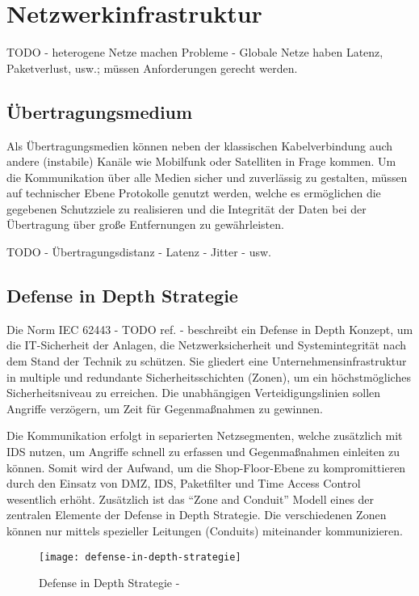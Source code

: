 \section{Netzwerkinfrastruktur}
TODO - heterogene Netze machen Probleme - Globale Netze haben Latenz, Paketverlust, usw.; müssen Anforderungen gerecht werden.

\subsection{Übertragungsmedium}
Als Übertragungsmedien können neben der klassischen Kabelverbindung auch andere (instabile) Kanäle wie Mobilfunk oder Satelliten in Frage kommen. Um die Kommunikation über alle Medien sicher und zuverlässig zu gestalten, müssen auf technischer Ebene Protokolle genutzt werden, welche es ermöglichen die gegebenen Schutzziele zu realisieren und die Integrität der Daten bei der Übertragung über große Entfernungen zu gewährleisten.

TODO - Übertragungsdistanz - Latenz - Jitter - usw.

\subsection{Defense in Depth Strategie}
Die Norm IEC 62443 - TODO ref. - beschreibt ein Defense in Depth Konzept, um die IT-Sicherheit der Anlagen, die Netzwerksicherheit und Systemintegrität nach dem Stand der Technik zu schützen. Sie gliedert eine Unternehmensinfrastruktur in multiple und redundante Sicherheitsschichten (Zonen), um ein höchstmögliches Sicherheitsniveau zu erreichen. Die unabhängigen Verteidigungslinien sollen Angriffe verzögern, um Zeit für Gegenmaßnahmen zu gewinnen.

Die Kommunikation erfolgt in separierten Netzsegmenten, welche zusätzlich mit \ac{IDS} nutzen, um Angriffe schnell zu erfassen und Gegenmaßnahmen einleiten zu können. Somit wird der Aufwand, um die Shop-Floor-Ebene zu kompromittieren durch den Einsatz von \ac{DMZ}, \ac{IDS}, Paketfilter und Time Access Control wesentlich erhöht. Zusätzlich ist das "`Zone and Conduit"' Modell eines der zentralen Elemente der Defense in Depth Strategie. Die verschiedenen Zonen können nur mittels spezieller Leitungen (Conduits) miteinander kommunizieren.  

\begin{figure}[h]
    \centering
    \texttt{[image: defense-in-depth-strategie]}
    \caption{Defense in Depth Strategie - \cite{kuipers2006}}
    \label{Kap3:Defense-in-Depth}
\end{figure}

